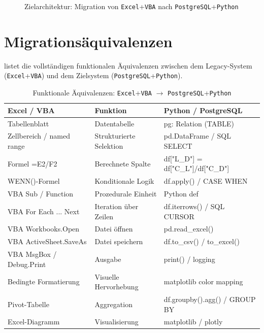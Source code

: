\documentclass[12pt,a4paper]{report}
\theoremstyle{definition}
\theoremstyle{remark}
\newcommand{\excel}{\texttt{Excel}}
\newcommand{\vba}{\texttt{VBA}}
\newcommand{\pg}{\texttt{PostgreSQL}}
\newcommand{\py}{\texttt{Python}}
\begin{document}
\begin{figure}[H]
\caption{Zielarchitektur: Migration von \excel{}+\vba{} nach \pg{}+\py{}}
\label{fig:arch}
\end{figure}

\section{Migrationsäquivalenzen}

 listet die vollständigen funktionalen \"Aquivalenzen zwischen
dem Legacy-System (\excel{}+\vba) und dem Zielsystem (\pg{}+\py).

\begin{table}[H]
\centering
\caption{Funktionale \"Aquivalenzen: \excel{}+\vba{} $\to$ \pg{}+\py}
\label{tab:equiv}
\renewcommand{\arraystretch}{1.3}
\begin{tabularx}{\linewidth}{>{\ttfamily\footnotesize}l >{\footnotesize}X >{\ttfamily\footnotesize}X}
\toprule
\textbf{Excel / VBA}         & \textbf{Funktion}                  & \textbf{Python / PostgreSQL} \\
\midrule
Tabellenblatt                & Datentabelle                       & pg: Relation (TABLE) \\
Zellbereich / named range    & Strukturierte Selektion            & pd.DataFrame / SQL SELECT \\
Formel =E2/F2                & Berechnete Spalte                  & df["L\_D"] = df["C\_L"]/df["C\_D"] \\
WENN()-Formel                & Konditionale Logik                 & df.apply() / CASE WHEN \\
VBA Sub / Function           & Prozedurale Einheit                & Python def \\
VBA For Each ... Next        & Iteration über Zeilen              & df.iterrows() / SQL CURSOR \\
VBA Workbooks.Open           & Datei \"offnen                       & pd.read\_excel() \\
VBA ActiveSheet.SaveAs       & Datei speichern                    & df.to\_csv() / to\_excel() \\
VBA MsgBox / Debug.Print     & Ausgabe                            & print() / logging \\
Bedingte Formatierung        & Visuelle Hervorhebung              & matplotlib color mapping \\
Pivot-Tabelle                & Aggregation                        & df.groupby().agg() / GROUP BY \\
Excel-Diagramm               & Visualisierung                     & matplotlib / plotly \\
\bottomrule
\end{tabularx}
\end{table}
\end{document}
